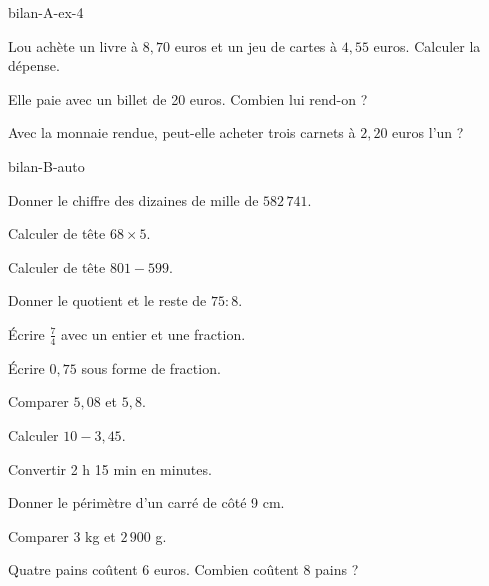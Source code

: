 \begin{blocEdition}{bilan-A-ex-4}
\begin{questions}
\item Lou achète un livre à $8{,}70$ euros et un jeu de cartes à $4{,}55$ euros. Calculer la dépense.
\item Elle paie avec un billet de 20 euros. Combien lui rend-on ?
\item Avec la monnaie rendue, peut-elle acheter trois carnets à $2{,}20$ euros l’un ?
\end{questions}\par{}\par\par{}\par{}\par{}\par{}\par{}\par{}
\end{blocEdition}
\begin{blocEdition}{bilan-B-auto}
\begin{questions}
\item Donner le chiffre des dizaines de mille de $582\,741$.
\item Calculer de tête $68\times5$.
\item Calculer de tête $801-599$.
\item Donner le quotient et le reste de $75:8$.
\item Écrire $\frac74$ avec un entier et une fraction.
\item Écrire $0{,}75$ sous forme de fraction.
\item Comparer $5{,}08$ et $5{,}8$.
\item Calculer $10-3{,}45$.
\item Convertir 2 h 15 min en minutes.
\item Donner le périmètre d’un carré de côté 9 cm.
\item Comparer 3 kg et $2\,900$ g.
\item Quatre pains coûtent 6 euros. Combien coûtent 8 pains ?\end{questions}
\end{blocEdition}
